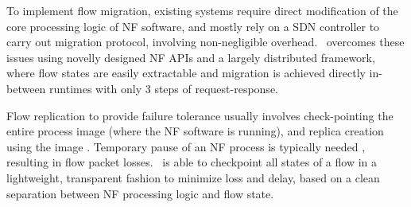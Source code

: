 To implement flow migration, existing systems \cite{gember2015opennf}\cite{rajagopalan2013split} require direct modification of the core processing logic of NF software, and mostly rely on a SDN controller to carry out migration protocol, involving non-negligible overhead. %
\nfactor~overcomes these issues using novelly designed NF APIs and a largely distributed framework, where flow states are easily extractable and migration is achieved directly in-between runtimes with only 3 steps of request-response. %

Flow replication to provide failure tolerance usually involves check-pointing the entire process image (where the NF software is running), and replica creation using the image \cite{sherry2015rollback} \cite{rajagopalan2013pico}. Temporary pause of an NF process is typically needed \cite{sherry2015rollback}, resulting in flow packet losses.
\nfactor~is able to checkpoint all states of a flow in a lightweight, transparent fashion to minimize loss and delay, based on a clean separation between NF processing logic and flow state. %


